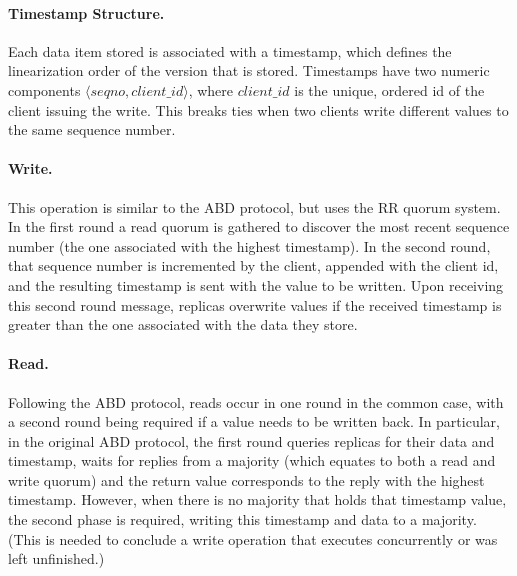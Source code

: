 \paragraph{Timestamp Structure.}
Each data item stored is associated with a
timestamp, which defines the linearization order of the version
that is stored. Timestamps have two numeric components $\langle
seqno, client\_id \rangle$, where $client\_id$ is the
unique, ordered id of the client issuing the write.  This
breaks ties when two clients write different values to the same
sequence number.

\paragraph{Write.}  This operation is similar to the ABD
protocol, but uses the \ac{RR} quorum system. In the first round
a read quorum is gathered to discover the most recent sequence number
(the one associated with the highest timestamp).  In the second round,
that sequence number is incremented by the client, appended with the
client id, and the resulting timestamp is sent with the value to be
written. Upon receiving this second round message, replicas overwrite
values if the received timestamp is greater than the one associated
with the data they store. 


\paragraph{Read.} Following the ABD protocol, reads occur in one
round in the common case, with a second round being required if a
value needs to be written back. In particular, in the original ABD
protocol, the first round queries replicas for their data and
timestamp, waits for replies from a majority (which equates to both a
read and write quorum) and the return value corresponds to the reply
with the highest timestamp. However, when there is no majority that
holds that timestamp value, the second phase is required, writing this
timestamp and data to a majority. (This is needed to conclude a write
operation that executes concurrently or was left unfinished.)

